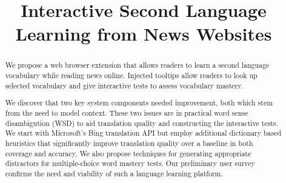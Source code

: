 \documentclass[11pt]{article}
\title{Interactive Second Language Learning from News Websites}
\date{}
\begin{document}
\maketitle
\begin{abstract}


We propose a web browser extension that allows readers to learn a
second language vocabulary while reading news online.  Injected
tooltips allow readers to look up selected vocabulary and give
interactive tests to assess vocabulary mastery.  

We discover that two key system components needed improvement, both
which stem from the need to model context.  These two issues are in
practical word sense disambigution (WSD) to aid translation quality
and constructing the interactive tests. We start with Microsoft's Bing
translation API but employ additional dictionary based heuristics that
significantly improve translation quality over a baseline in both
coverage and accuracy. We also propose techniques for generating
appropriate distractors for multiple-choice word mastery tests.  Our
preliminary user survey confirms the need and viability of such a
language learning platform.

\end{abstract}









%
%



\end{document}
